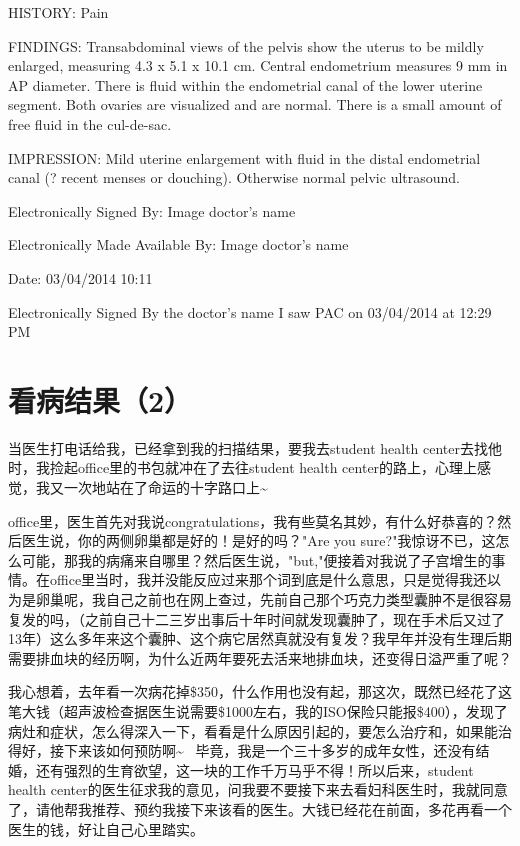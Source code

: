 \documentclass[12pt]{book}
\begin{document}
HISTORY: Pain

FINDINGS:  Transabdominal views of the pelvis show the uterus to be mildly enlarged, measuring 4.3 x 5.1 x 10.1 cm.  Central endometrium measures 9 mm in AP diameter.  There is fluid within the endometrial canal of the lower uterine segment.  Both ovaries are visualized and are normal.  There is a small amount of free fluid in the cul-de-sac.

IMPRESSION:  Mild uterine enlargement with fluid in the distal endometrial canal  (? recent menses or douching).  Otherwise normal pelvic ultrasound. 

Electronically Signed By: Image doctor's name

Electronically Made Available By: Image doctor's name

Date: 03/04/2014 10:11

Electronically Signed By the doctor's name I saw PAC on 03/04/2014 at 12:29 PM

\section{看病结果（2）}
\label{sec-30-5}

当医生打电话给我，已经拿到我的扫描结果，要我去student health center去找他时，我捡起office里的书包就冲在了去往student health center的路上，心理上感觉，我又一次地站在了命运的十字路口上\textasciitilde{}~ 

office里，医生首先对我说congratulations，我有些莫名其妙，有什么好恭喜的？然后医生说，你的两侧卵巢都是好的！是好的吗？"Are you sure?"我惊讶不已，这怎么可能，那我的病痛来自哪里？然后医生说，"but,"便接着对我说了子宫增生的事情。在office里当时，我并没能反应过来那个词到底是什么意思，只是觉得我还以为是卵巢呢，我自己之前也在网上查过，先前自己那个巧克力类型囊肿不是很容易复发的吗，（之前自己十二三岁出事后十年时间就发现囊肿了，现在手术后又过了13年）这么多年来这个囊肿、这个病它居然真就没有复发？我早年并没有生理后期需要排血块的经历啊，为什么近两年要死去活来地排血块，还变得日溢严重了呢？

我心想着，去年看一次病花掉\$350，什么作用也没有起，那这次，既然已经花了这笔大钱（超声波检查据医生说需要\$1000左右，我的ISO保险只能报\$400），发现了病灶和症状，怎么得深入一下，看看是什么原因引起的，要怎么治疗和，如果能治得好，接下来该如何预防啊\textasciitilde{}~ 毕竟，我是一个三十多岁的成年女性，还没有结婚，还有强烈的生育欲望，这一块的工作千万马乎不得！所以后来，student health center的医生征求我的意见，问我要不要接下来去看妇科医生时，我就同意了，请他帮我推荐、预约我接下来该看的医生。大钱已经花在前面，多花再看一个医生的钱，好让自己心里踏实。
\end{document}
